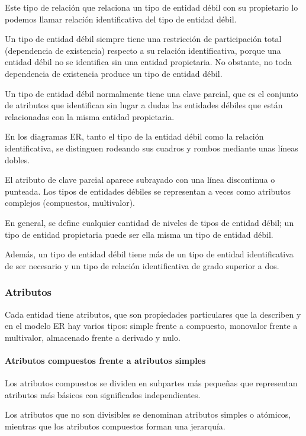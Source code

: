 Este tipo de relación que relaciona un tipo de entidad débil con su propietario lo podemos llamar relación identificativa del tipo de entidad débil. 


Un tipo de entidad débil siempre tiene una restricción de participación total (dependencia de existencia) respecto a su relación identificativa, porque una entidad débil no se identifica sin una entidad propietaria. No obstante, no toda dependencia de existencia produce un tipo de entidad débil.


Un tipo de entidad débil normalmente tiene una clave parcial, que es el conjunto de atributos que identifican sin lugar a dudas las entidades débiles que están relacionadas con la misma entidad propietaria. 


En los diagramas ER, tanto el tipo de la entidad débil como la relación identificativa, se distinguen rodeando sus cuadros y rombos mediante unas líneas dobles.


El atributo de clave parcial aparece subrayado con una línea discontinua o punteada. Los tipos de entidades débiles se representan a veces como atributos complejos (compuestos, multivalor). 


En general, se define cualquier cantidad de niveles de tipos de entidad débil; un tipo de entidad propietaria puede ser ella misma un tipo de entidad débil. 


Además, un tipo de entidad débil tiene más de un tipo de entidad identificativa de ser necesario y un tipo de relación identificativa de grado superior a dos.

\subsubsection{Atributos}
Cada entidad tiene atributos, que son propiedades particulares que la describen y en el modelo ER hay varios tipos: simple frente a compuesto, monovalor frente a multivalor, almacenado frente a derivado y nulo.


\paragraph*{Atributos compuestos frente a atributos simples} Los atributos compuestos se dividen en subpartes más pequeñas que representan atributos más básicos con significados independientes.


Los atributos que no son divisibles se denominan atributos simples o atómicos, mientras que los atributos compuestos forman una jerarquía. 


